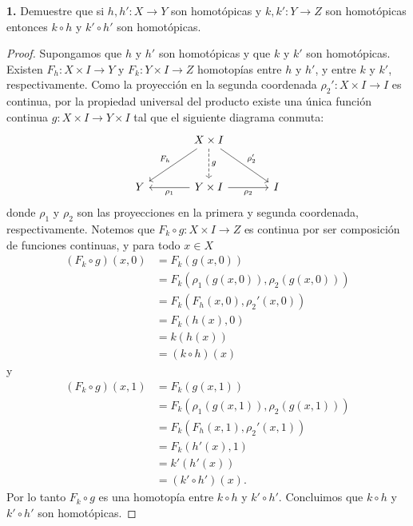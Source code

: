 \textbf{1.} Demuestre que si $h,h':X\to Y$ son homotópicas y $k,k':Y\to Z$ son homotópicas entonces $k\circ h$ y $k'\circ h'$ son homotópicas.
\begin{proof}
Supongamos que $h$ y $h'$ son homotópicas y que $k$ y $k'$ son homotópicas. Existen $F_h:X\times I\to Y$ y $F_k:Y\times I\to Z$ homotopías entre $h$ y $h'$, y entre $k$ y $k'$, respectivamente. Como la proyección en la segunda coordenada $\rho_2':X\times I\to I$ es continua, por la propiedad universal del producto existe una única función continua $g:X\times I\to Y\times I$ tal que el siguiente diagrama conmuta:
\[
\begin{tikzcd}[column sep=large,row sep=large]
 & X\times I \arrow[dl,"F_h"'] \arrow[dr,"\rho_2'"] \arrow[d,dashed,"g"] & \\
Y & Y\times I \arrow[l,"\rho_1"] \arrow[r,"\rho_2"'] & I
\end{tikzcd}
\]
donde $\rho_1$ y $\rho_2$ son las proyecciones en la primera y segunda coordenada, respectivamente. Notemos que $F_k\circ g:X\times I\to Z$ es continua por ser composición de funciones continuas, y para todo $x\in X$
\begin{align*}
(F_k\circ g)(x,0)&=F_k(g(x,0))\\
&=F_k(\rho_1(g(x,0)),\rho_2(g(x,0)))\\
&=F_k(F_h(x,0),\rho_2'(x,0))\\
&=F_k(h(x),0)\\
&=k(h(x))\\
&=(k\circ h)(x)
\end{align*}
y
\begin{align*}
(F_k\circ g)(x,1)&=F_k(g(x,1))\\
&=F_k(\rho_1(g(x,1)),\rho_2(g(x,1)))\\
&=F_k(F_h(x,1),\rho_2'(x,1))\\
&=F_k(h'(x),1)\\
&=k'(h'(x))\\
&=(k'\circ h')(x).
\end{align*}
Por lo tanto $F_k\circ g$ es una homotopía entre $k\circ h$ y $k'\circ h'$. Concluimos que $k\circ h$ y $k'\circ h'$ son homotópicas.
\end{proof}\clearpage
